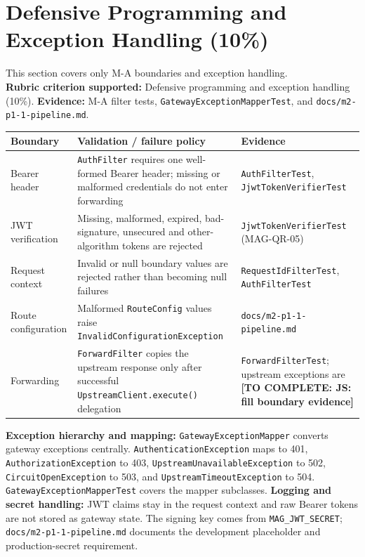 \documentclass[12pt,a4paper]{article}
\newcommand{\cls}[1]{\nolinkurl{#1}}
\newcommand{\todo}[1]{\textcolor{red!70!black}{\textbf{[TO COMPLETE: #1]}}}
\begin{document}
\section{Defensive Programming and Exception Handling (10\%)}\label{sec:defensive}
This section covers only M-A boundaries and exception handling.\\
\textbf{Rubric criterion supported:} Defensive programming and exception handling (10\%). \textbf{Evidence:} M-A filter tests, \cls{GatewayExceptionMapperTest}, and \cls{docs/m2-p1-1-pipeline.md}.
\begin{longtable}{L{3.3cm} L{4.5cm} L{4.5cm}}\toprule
\textbf{Boundary} & \textbf{Validation / failure policy} & \textbf{Evidence}\\\midrule\endhead
Bearer header & \cls{AuthFilter} requires one well-formed Bearer header; missing or malformed credentials do not enter forwarding & \cls{AuthFilterTest}, \cls{JjwtTokenVerifierTest}\\
JWT verification & Missing, malformed, expired, bad-signature, unsecured and other-algorithm tokens are rejected & \cls{JjwtTokenVerifierTest} (MAG-QR-05)\\
Request context & Invalid or null boundary values are rejected rather than becoming null failures & \cls{RequestIdFilterTest}, \cls{AuthFilterTest}\\
Route configuration & Malformed \cls{RouteConfig} values raise \cls{InvalidConfigurationException} & \cls{docs/m2-p1-1-pipeline.md}\\
Forwarding & \cls{ForwardFilter} copies the upstream response only after successful \cls{UpstreamClient.execute()} delegation & \cls{ForwardFilterTest}; upstream exceptions are \todo{JS: fill boundary evidence}\\\bottomrule\end{longtable}
\textbf{Exception hierarchy and mapping:} \cls{GatewayExceptionMapper} converts gateway exceptions centrally. \cls{AuthenticationException} maps to 401, \cls{AuthorizationException} to 403, \cls{UpstreamUnavailableException} to 502, \cls{CircuitOpenException} to 503, and \cls{UpstreamTimeoutException} to 504. \cls{GatewayExceptionMapperTest} covers the mapper subclasses.
\textbf{Logging and secret handling:} JWT claims stay in the request context and raw Bearer tokens are not stored as gateway state. The signing key comes from \texttt{MAG\_JWT\_SECRET}; \cls{docs/m2-p1-1-pipeline.md} documents the development placeholder and production-secret requirement.
\end{document}
